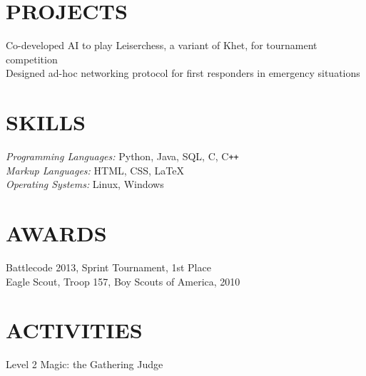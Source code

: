 \documentclass[margin]{res}
\begin{document}
\begin{resume}
\section{PROJECTS}  Co-developed AI to play Leiserchess, a variant of Khet, for 
                      tournament competition \\
                    Designed ad-hoc networking protocol for first responders in
                      emergency situations
 
\section{SKILLS}    {\sl Programming Languages:} Python, Java, SQL, C,
                      C\texttt{++} \\
                    {\sl Markup Languages:} HTML, CSS, \LaTeX \\
                    {\sl Operating Systems:} Linux, Windows
 
 
\section{AWARDS}    Battlecode 2013, Sprint Tournament, 1st Place\\
                    Eagle Scout, Troop 157, Boy Scouts of America, 2010

\section{ACTIVITIES}
                    Level 2 Magic: the Gathering Judge

\end{resume}
\end{document}
